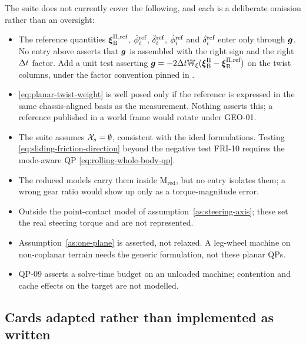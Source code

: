 \documentclass[10pt]{article}
\newcommand{\wheelAngle}{\phi}
\begin{document}
The suite does not currently cover the following, and each is a deliberate
omission rather than an oversight:
\begin{itemize}
  \item {} The reference quantities
    $\boldsymbol{\xi}^{\Pi,\text{ref}}_{\text{B}}$,
    $\reff{\ddot{\wheelAngle}}_i$, $\ddot\delta^{\text{ref}}_i$,
    $\reff{\dot{\wheelAngle}}_i$ and $\dot\delta^{\text{ref}}_i$ enter only through
    $\boldsymbol{g}$. No entry above asserts that $\boldsymbol{g}$ is assembled with the right
    sign and the right $\Delta t$ factor. Add a unit test asserting
    $\boldsymbol{g}=-2\Delta t\mathbb{W}_{\xi}
    (\boldsymbol{\xi}^{\Pi}_{\text{B}}-\boldsymbol{\xi}^{\Pi,\text{ref}}_{\text{B}})$ on the
    twist columns, under the factor convention pinned in
    .
  \item {}
    \eqref{eq:planar-twist-weight} is well posed only if the reference is
    expressed in the same chassis-aligned basis as the measurement. Nothing
    asserts this; a reference published in a world frame would rotate under
    GEO-01.
  \item {} The suite assumes
    $\mathcal{X}_{s}=\emptyset$, consistent with the ideal formulations. Testing
    \eqref{eq:sliding-friction-direction} beyond the negative test FRI-10
    requires the mode-aware QP \eqref{eq:rolling-whole-body-qp}.
  \item {} The reduced models carry
    them inside $\text{M}_{\text{red}}$, but no entry isolates them; a wrong
    gear ratio would show up only as a torque-magnitude error.
  \item {} Outside the
    point-contact model of assumption~\ref{as:steering-axis}; these set the
    real steering torque and are not represented.
  \item {} Assumption~\ref{as:one-plane} is
    asserted, not relaxed. A leg-wheel machine on non-coplanar terrain needs
    the generic formulation, not these planar QPs.
  \item {} QP-09 asserts a solve-time budget on an
    unloaded machine; contention and cache effects on the target are not
    modelled.
\end{itemize}

\subsection{Cards adapted rather than implemented as written}
\label{sec:test-gaps-adapted}
\end{document}
